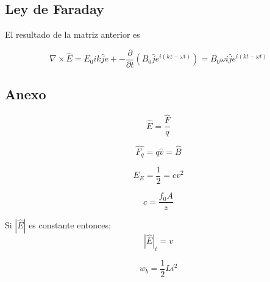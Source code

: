 \documentclass[]{article}
\begin{document}
\subsection{Ley de Faraday}

\begin{flushleft}
	
\end{flushleft}



El resultado de la matriz anterior es

\begin{equation}
\nabla \times \hat{E}=E_0ik\hat{j}e+-\frac{\partial}{\partial t}(B_0\hat{j}e^{i(kz - \omega t)})=B_0 \omega i \hat{j} e^{i(kt-\omega t)}
\end{equation}


\subsection{Anexo}

\begin{equation}
\hat{E}=\frac{\hat{F}}{q}
\end{equation}

\begin{equation}
\hat{F_q}=q\hat{v}=\hat{B}
\end{equation}

\begin{equation}
E_E=\frac{1}{2}=cv^2
\end{equation}

\begin{equation}
   c=\frac{f_0 A}{z}
\end{equation}

Si $|\hat{E}|$ es constante entonces:\\

\begin{equation}
   |\hat{E}|_t=v
\end{equation}

\begin{equation}
   w_b=\frac{1}{2}Li^2
\end{equation}
\end{document}
